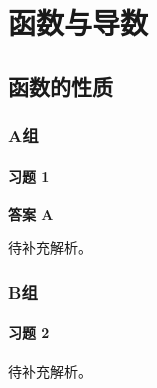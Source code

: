 \chapter{函数与导数}

\section{函数的性质}

\subsection*{A组}

\subsubsection*{习题 1}
\begin{solution}
	\textbf{答案 A}

	待补充解析。
\end{solution}

\subsection*{B组}

\subsubsection*{习题 2}
\begin{solution}
	待补充解析。
\end{solution}
